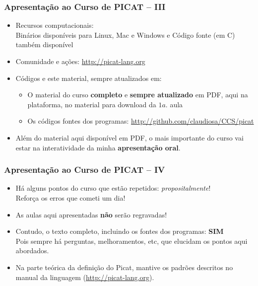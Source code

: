     
\begin{frame}[fragile]
  \frametitle{Apresentação ao Curso de PICAT -- III}
  \begin{itemize}
						
    \item Recursos computacionais:\\
    \pause 
    Binários disponíveis para Linux, Mac e Windows
     e Código fonte (em C) também disponível

    \item Comunidade e ações: \url{http://picat-lang.org}
    
    \pause
    \item Códigos e este material, sempre atualizados em: 

    \pause
    \begin{itemize}
      \item  O material do curso \textbf{completo} e \textbf{sempre atualizado} em PDF,
      aqui na plataforma, no material para download da $1a.$ aula
      
     \item   Os códigos fontes dos programas:  \url{http://github.com/claudiosa/CCS/picat}
    \end{itemize}

			\item Além do material aqui disponível em PDF, o mais importante  do curso
			 vai estar na interatividade
			da minha \textbf{apresentação oral}. 
			
    
  \end{itemize}

\end{frame}

    
\begin{frame}[fragile]
  \frametitle{Apresentação ao Curso de PICAT -- IV}
  \begin{itemize}

    \item Há alguns pontos do curso que estão repetidos: \textit{propositalmente}!\\
    \pause
    Reforça os erros que cometi um dia!

    \pause
    \item As aulas aqui apresentadas \textbf{não} serão regravadas!
        
    \pause 
    \item Contudo, o texto completo, incluindo os fontes dos programas: \textbf{SIM}\\
    Pois sempre há perguntas, melhoramentos, etc, que elucidam os pontos aqui abordados.
    
    \pause 
    \item Na parte teórica da definição do Picat, mantive os padrões 
    descritos no manual da linguagem (\url{http://picat-lang.org}).
    
  \end{itemize}

\end{frame}

